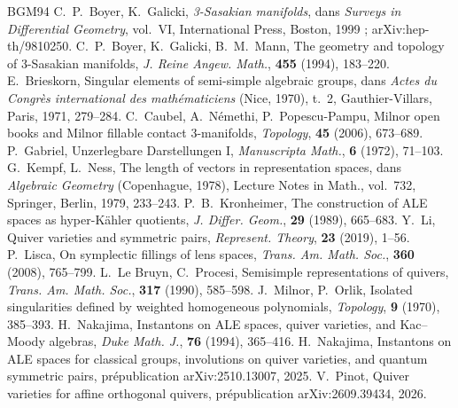 \documentclass[11pt]{article}
\theoremstyle{definition}
\theoremstyle{remark}
\begin{document}
\begin{thebibliography}{BGM94}
 C.~P.~Boyer, K.~Galicki, \emph{3-Sasakian manifolds}, dans \emph{Surveys in Differential Geometry}, vol.~VI, International Press, Boston, 1999 ; arXiv:hep-th/9810250.
 C.~P.~Boyer, K.~Galicki, B.~M.~Mann, The geometry and topology of 3-Sasakian manifolds, \emph{J. Reine Angew. Math.}, \textbf{455} (1994), 183--220.
 E.~Brieskorn, Singular elements of semi-simple algebraic groups, dans \emph{Actes du Congrès international des mathématiciens} (Nice, 1970), t.~2, Gauthier-Villars, Paris, 1971, 279--284.
 C.~Caubel, A.~Némethi, P.~Popescu-Pampu, Milnor open books and Milnor fillable contact 3-manifolds, \emph{Topology}, \textbf{45} (2006), 673--689.
 P.~Gabriel, Unzerlegbare Darstellungen I, \emph{Manuscripta Math.}, \textbf{6} (1972), 71--103.
 G.~Kempf, L.~Ness, The length of vectors in representation spaces, dans \emph{Algebraic Geometry} (Copenhague, 1978), Lecture Notes in Math., vol.~732, Springer, Berlin, 1979, 233--243.
 P.~B.~Kronheimer, The construction of ALE spaces as hyper-Kähler quotients, \emph{J. Differ. Geom.}, \textbf{29} (1989), 665--683.
 Y.~Li, Quiver varieties and symmetric pairs, \emph{Represent. Theory}, \textbf{23} (2019), 1--56.
 P.~Lisca, On symplectic fillings of lens spaces, \emph{Trans. Am. Math. Soc.}, \textbf{360} (2008), 765--799.
 L.~Le Bruyn, C.~Procesi, Semisimple representations of quivers, \emph{Trans. Am. Math. Soc.}, \textbf{317} (1990), 585--598.
 J.~Milnor, P.~Orlik, Isolated singularities defined by weighted homogeneous polynomials, \emph{Topology}, \textbf{9} (1970), 385--393.
 H.~Nakajima, Instantons on ALE spaces, quiver varieties, and Kac--Moody algebras, \emph{Duke Math. J.}, \textbf{76} (1994), 365--416.
 H.~Nakajima, Instantons on ALE spaces for classical groups, involutions on quiver varieties, and quantum symmetric pairs, prépublication arXiv:2510.13007, 2025.
 V.~Pinot, Quiver varieties for affine orthogonal quivers, prépublication arXiv:2609.39434, 2026.
\end{thebibliography}
\end{document}
